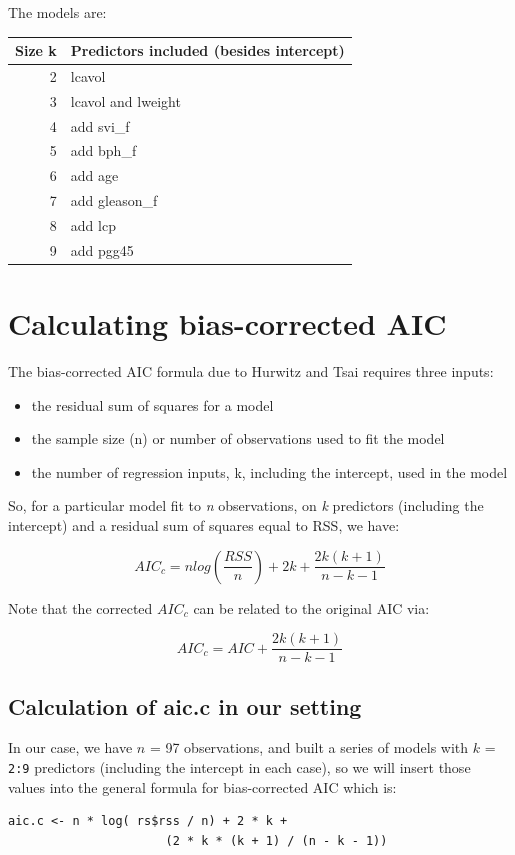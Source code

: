 \documentclass[]{book}
\providecommand{\tightlist}{%
  \setlength{\itemsep}{0pt}\setlength{\parskip}{0pt}}
\theoremstyle{definition}
\theoremstyle{definition}
\theoremstyle{definition}
\theoremstyle{remark}
\begin{document}
The models are:

\begin{longtable}[]{@{}rl@{}}
\toprule
Size k & Predictors included (besides intercept)\tabularnewline
\midrule
\endhead
2 & lcavol\tabularnewline
3 & lcavol and lweight\tabularnewline
4 & add svi\_f\tabularnewline
5 & add bph\_f\tabularnewline
6 & add age\tabularnewline
7 & add gleason\_f\tabularnewline
8 & add lcp\tabularnewline
9 & add pgg45\tabularnewline
\bottomrule
\end{longtable}

\section{Calculating bias-corrected
AIC}\label{calculating-bias-corrected-aic}

The bias-corrected AIC formula due to Hurwitz and Tsai requires three
inputs:

\begin{itemize}
\tightlist
\item
  the residual sum of squares for a model
\item
  the sample size (n) or number of observations used to fit the model
\item
  the number of regression inputs, k, including the intercept, used in
  the model
\end{itemize}

So, for a particular model fit to \emph{n} observations, on \emph{k}
predictors (including the intercept) and a residual sum of squares equal
to RSS, we have:

\[
AIC_c = n log(\frac{RSS}{n}) + 2k + \frac{2k (k+1)}{n-k-1}
\]

Note that the corrected \(AIC_c\) can be related to the original AIC
via:

\[
AIC_c = AIC + \frac{2k (k+1)}{n - k - 1}
\]

\subsection{Calculation of aic.c in our
setting}\label{calculation-of-aic.c-in-our-setting}

In our case, we have \(n\) = 97 observations, and built a series of
models with \(k\) = \texttt{2:9} predictors (including the intercept in
each case), so we will insert those values into the general formula for
bias-corrected AIC which is:

\begin{verbatim}
aic.c <- n * log( rs$rss / n) + 2 * k + 
                      (2 * k * (k + 1) / (n - k - 1))
\end{verbatim}
\end{document}
